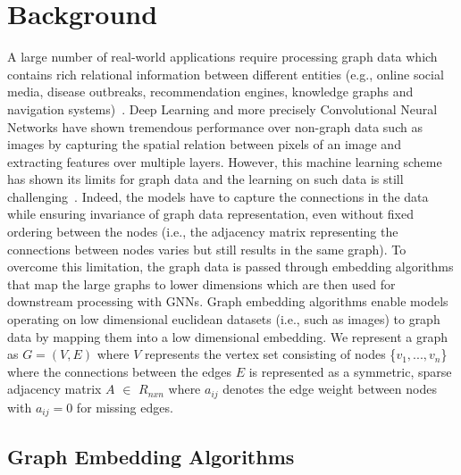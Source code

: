 \section{Background}\label{background}

A large number of real-world applications require processing graph data which contains rich relational information between different entities (e.g., online social media, disease outbreaks, recommendation engines, knowledge graphs and navigation systems)~\cite{zhou2018graph}.
Deep Learning and more precisely Convolutional Neural Networks have shown tremendous performance over non-graph data such as images by capturing the spatial relation between pixels of an image and extracting features over multiple layers.
However, this machine learning scheme has shown its limits for graph data and the learning on such data is still challenging~\cite{zhou2018graph}.
Indeed, the models have to capture the connections in the data while ensuring invariance of graph data representation, even without fixed ordering between the nodes (i.e., the adjacency matrix representing the connections between nodes varies but still results in the same graph). %
To overcome this limitation, the graph data is passed through embedding algorithms that map the large graphs to lower dimensions which are then used for downstream processing with GNNs.
Graph embedding algorithms enable models operating on low dimensional euclidean datasets (i.e., such as images) to graph data by mapping them into a low dimensional embedding.
We represent a graph as $G=(V,E)$ where $V$ represents the vertex set consisting of nodes \{$v_1,...,v_n$\} where the connections between the edges $E$ is represented as a symmetric, sparse adjacency matrix $A$ $\in$ $R_{nxn}$ where $a_{ij}$ denotes the edge weight between nodes with $a_{ij}= 0$ for missing edges.


\subsection{Graph Embedding Algorithms}

